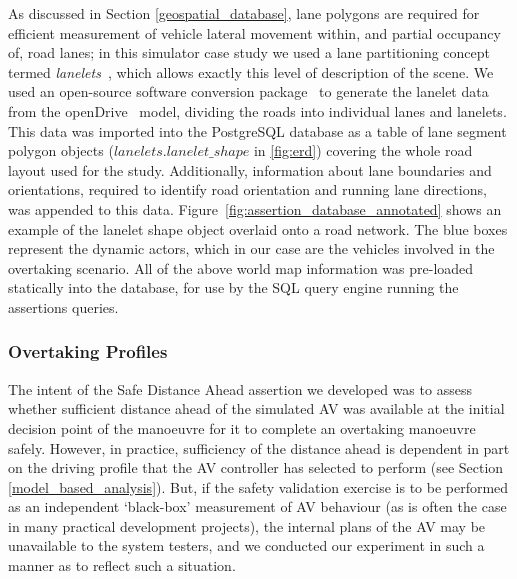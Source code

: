 
As discussed in Section \ref{geospatial_database}, lane polygons are required for efficient measurement of vehicle lateral movement within, and partial occupancy of, road lanes; in this simulator case study we used a lane partitioning concept termed \textit{lanelets}~\cite{lanelets2014}, which allows exactly this level of description of the scene. We used an open-source software conversion package~\cite{lanelets_to_openDrive} to generate the lanelet data from the openDrive~\cite{opendrive} model, dividing the roads into individual lanes and lanelets. This data was imported into the PostgreSQL database as a table of lane segment polygon objects ($lanelets.lanelet\_shape$ in \ref{fig:erd}) covering the whole road layout used for the study. Additionally, information about lane boundaries and orientations, required to identify road orientation and running lane directions, was appended to this data. 
%
Figure~\ref{fig:assertion_database_annotated} shows an example of the lanelet shape object overlaid onto a road network. The blue boxes represent the dynamic actors, which in our case are the vehicles involved in the overtaking scenario. 
%
All of the above world map information was pre-loaded statically into the database, for use by the SQL query engine running the assertions queries.%

\subsubsection{Overtaking Profiles} \label{overtaking_profiles}
The intent of the Safe Distance Ahead assertion we developed was to assess whether sufficient distance ahead of the simulated AV was available at the initial decision point of the manoeuvre for it to complete an overtaking manoeuvre safely. However, in practice, sufficiency of the distance ahead is dependent in part on the driving profile that the AV controller has selected to perform (see Section \ref{model_based_analysis}). But, if the safety validation exercise is to be performed as an independent `black-box' measurement of AV behaviour (as is often the case in many practical development projects), the internal plans of the AV may be unavailable to the system testers, and we conducted our experiment in such a manner as to reflect such a situation.

